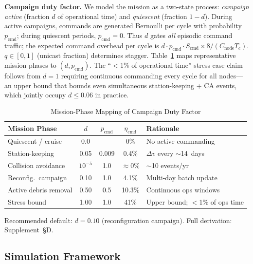 \documentclass[journal]{IEEEtran}
\begin{document}
\textbf{Campaign duty factor.} We model the mission as a two-state process: \emph{campaign active} (fraction $d$ of operational time) and \emph{quiescent} (fraction $1 - d$). During active campaigns, commands are generated Bernoulli per cycle with probability $p_{\text{cmd}}$; during quiescent periods, $p_{\text{cmd}} = 0$. Thus $d$ gates \emph{all} episodic command traffic; the expected command overhead per cycle is $d \cdot p_{\text{cmd}} \cdot S_{\text{cmd}} \times 8 / (C_{\text{node}} T_c)$. $q \in [0,1]$ (unicast fraction) determines stagger. Table~\ref{tab:mission_phase_d} maps representative mission phases to $(d, p_{\text{cmd}})$. The ``$<$1\% of operational time'' stress-case claim follows from $d = 1$ requiring continuous commanding every cycle for all nodes---an upper bound that bounds even simultaneous station-keeping + CA events, which jointly occupy $d \leq 0.06$ in practice.

\begin{table}[t]
    \centering
    \caption{Mission-Phase Mapping of Campaign Duty Factor}
    \label{tab:mission_phase_d}
    \footnotesize
    \begin{tabular}{@{}lcccl@{}}
        \toprule
        \textbf{Mission Phase} & $d$ & $p_{\text{cmd}}$ & $\eta_{\text{cmd}}$ & \textbf{Rationale} \\
        \midrule
        Quiescent / cruise & 0.0 & --- & 0\% & No active commanding \\
        Station-keeping & 0.05 & 0.009 & 0.4\% & $\Delta v$ every ${\sim}$14~days \\
        Collision avoidance & $10^{-5}$ & 1.0 & $\approx$0\% & ${\sim}$10 events/yr \\
        Reconfig.\ campaign & 0.10 & 1.0 & 4.1\% & Multi-day batch update \\
        Active debris removal & 0.50 & 0.5 & 10.3\% & Continuous ops windows \\
        Stress bound & 1.00 & 1.0 & 41\% & Upper bound; $<$1\% of ops time \\
        \bottomrule
    \end{tabular}
\end{table}

\noindent Recommended default: $d = 0.10$ (reconfiguration campaign). Full derivation: Supplement~\S D.

\subsection{Simulation Framework}
\end{document}
